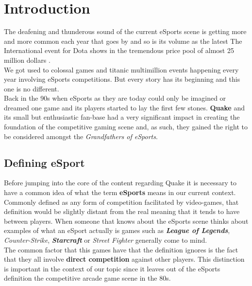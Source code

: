 \section{Introduction}

The deafening and thunderous sound of the current eSports scene is getting more and more common each year that goes by and so is its volume as the latest The International event for Dota shows in the tremendous price pool of almost 25 million dollars \citep{esportsEarnings}.\\

We got used to colossal games and titanic multimillion events happening every year involving eSports competitions. But every story has its beginning and this one is no different.\\

Back in the 90s when eSports as they are today could only be imagined or dreamed one game and its players started to lay the first few stones. \textbf{Quake} and its small but enthusiastic fan-base had a very significant impact in creating the foundation of the competitive gaming scene and, as such, they gained the right to be considered amongst the \textit{Grandfathers of eSports}.\\

\subsection{Defining eSport}

Before jumping into the core of the content regarding Quake it is necessary to have a common idea of what the term \textbf{eSports} means in our current context. Commonly defined as any form of competition facilitated by video-games, that definition would be slightly distant from the real meaning that it tends to have between players. When someone that knows about the eSports scene thinks about examples of what an eSport actually is games such as \textbf{\textit{League of Legends}}, \textit{\textit{Counter-Strike}}, \textbf{\textit{Starcraft}} or \textit{\textit{Street Fighter}} generally come to mind.\\

The common factor that this games have that the definition ignores is the fact that they all involve \textbf{direct competition} against other players. This distinction is important in the context of our topic since it leaves out of the eSports definition the competitive arcade game scene in the 80s.\\

